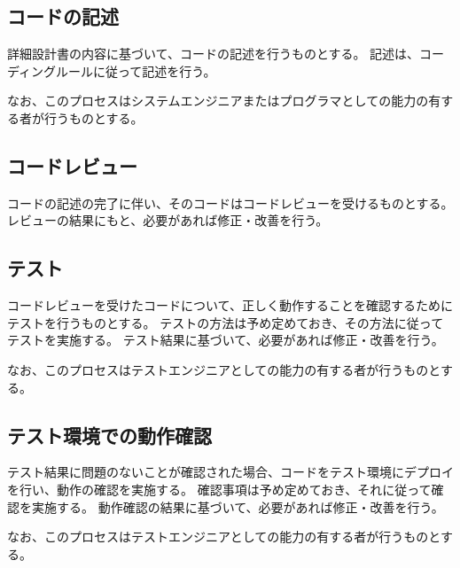 \subsection{コードの記述}
詳細設計書の内容に基づいて、コードの記述を行うものとする。
記述は、コーディングルールに従って記述を行う。

なお、このプロセスはシステムエンジニアまたはプログラマとしての能力の有する者が行うものとする。

\subsection{コードレビュー}
コードの記述の完了に伴い、そのコードはコードレビューを受けるものとする。
レビューの結果にもと、必要があれば修正・改善を行う。

\subsection{テスト}
コードレビューを受けたコードについて、正しく動作することを確認するためにテストを行うものとする。
テストの方法は予め定めておき、その方法に従ってテストを実施する。
テスト結果に基づいて、必要があれば修正・改善を行う。

なお、このプロセスはテストエンジニアとしての能力の有する者が行うものとする。

\subsection{テスト環境での動作確認}
テスト結果に問題のないことが確認された場合、コードをテスト環境にデプロイを行い、動作の確認を実施する。
確認事項は予め定めておき、それに従って確認を実施する。
動作確認の結果に基づいて、必要があれば修正・改善を行う。

なお、このプロセスはテストエンジニアとしての能力の有する者が行うものとする。

